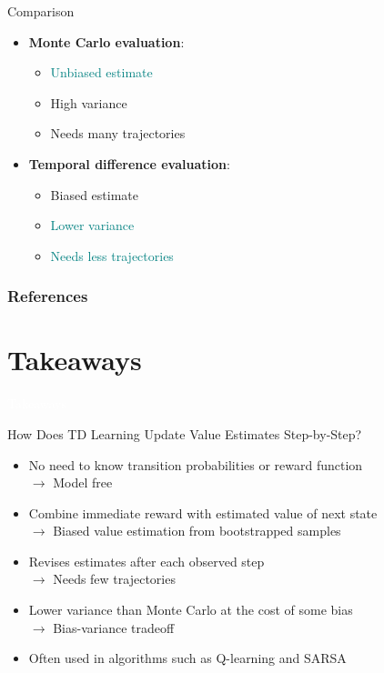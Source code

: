 \documentclass[11pt,table]{beamer}
\begin{document}
\begin{frame}{Comparison}


    \begin{itemize}
        \item \textbf{Monte Carlo evaluation}:
\begin{itemize}
\item \textcolor{teal}{Unbiased estimate}
\item \textcolor{red1}{High variance}
\item \textcolor{red1}{Needs many trajectories}\\[2ex]
 
\end{itemize} 
\item \textbf{Temporal difference evaluation}:
\begin{itemize}
\item \textcolor{red1}{Biased estimate}
\item \textcolor{teal}{Lower variance}
\item \textcolor{teal}{Needs less trajectories}
 
\end{itemize}
    \end{itemize}
\end{frame}


\begin{frame}[t,allowframebreaks
]\nocite{*}
\frametitle{References}
\footnotesize

\end{frame}
\section{Takeaways}
{
\begin{frame}
\centering
\Huge
\textcolor{white}{Takeaways}
\thispagestyle{empty}
\end{frame}
}



\begin{frame}{How Does TD Learning Update Value Estimates Step-by-Step?}
\begin{itemize}
    \item No need to know transition probabilities or reward function\\$\rightarrow$ Model free\\[2ex]
    \item Combine immediate reward with estimated value of next state\\$\rightarrow$ Biased value estimation from bootstrapped samples\\[2ex]
    \item Revises estimates after each observed step\\$\rightarrow$ Needs few trajectories\\[2ex]
    \item Lower variance than Monte Carlo at the cost of some bias\\$\rightarrow$ Bias-variance tradeoff\\[2ex]
    \item Often used in algorithms such as Q-learning and SARSA

  \end{itemize}
\end{frame}
\end{document}
